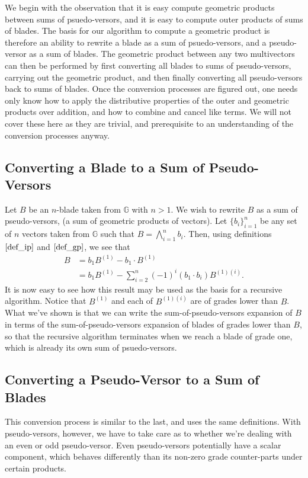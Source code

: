 \documentclass{article}
\newcommand{\G}{\mathbb{G}}
\begin{document}
We begin with the observation that it is easy compute geometric products
between sums of psuedo-versors, and it is easy to compute outer products of
sums of blades.  The basis for our algorithm to compute a geometric product
is therefore an ability to rewrite a blade as a sum of psuedo-versors, and a pseudo-versor
as a sum of blades.  The geometric product between any two multivectors
can then be performed by first converting all blades to sums of pseudo-versors,
carrying out the geometric product, and then finally converting all pseudo-versors
back to sums of blades.  Once the conversion processes are figured out,
one needs only know how to apply the distributive properties of the outer
and geometric products over addition, and how to combine and cancel like terms.
We will not cover these here as they are trivial, and prerequisite to an
understanding of the conversion processes anyway.

\subsection*{Converting a Blade to a Sum of Pseudo-Versors}

Let $B$ be an $n$-blade taken from $\G$ with $n>1$.  We wish to rewrite $B$
as a sum of pseudo-versors, (a sum of geometric products of vectors).
Let $\{b_i\}_{i=1}^n$ be any set of $n$ vectors taken from $\G$
such that $B=\bigwedge_{i=1}^n b_i$.  Then, using definitions $\eqref{def_ip}$
and $\eqref{def_gp}$, we see that
\begin{align}
B &= b_1B^{(1)} - b_1\cdot B^{(1)}\nonumber \\
 &= b_1B^{(1)} - \sum_{i=2}^n(-1)^i(b_1\cdot b_i)B^{(1)(i)}.\label{equ_op_to_gp}
\end{align}
It is now easy to see how this result may be used as the basis for
a recursive algorithm.  Notice that $B^{(1)}$ and each of $B^{(1)(i)}$
are of grades lower than $B$.  What we've shown is that we can write the
sum-of-pseudo-versors expansion of $B$ in terms of the sum-of-pseudo-versors expansion
of blades of grades lower than $B$, so that the recursive algorithm
terminates when we reach a blade of grade one, which is already its
own sum of psuedo-versors.

\subsection*{Converting a Pseudo-Versor to a Sum of Blades}

This conversion process is similar to the last, and uses the same definitions.
With pseudo-versors, however, we have to take care as to whether we're dealing
with an even or odd pseudo-versor.  Even pseudo-versors potentially have a scalar component,
which behaves differently than its non-zero grade counter-parts under certain
products.
\end{document}

